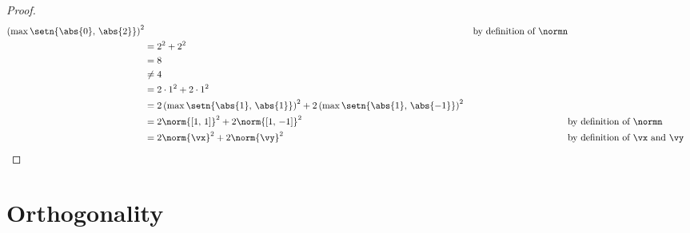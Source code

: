 \begin{proof}
\begin{align*}
       \left(\max\setn{\abs{0},\,\abs{2}}\right)^2
    && \text{by definition of $\normn$}
  \\&= 2^2 + 2^2
  \\&= 8
  \\&\ne  4
  \\&= 2\cdot 1^2 + 2\cdot 1^2
  \\&= 2\left(\max\setn{\abs{1},\,\abs{1}}\right)^2
     + 2\left(\max\setn{\abs{1},\,\abs{-1}}\right)^2
  \\&= 2\norm{[1,\,1]}^2 + 2\norm{[1,\,-1]}^2
    && \text{by definition of $\normn$}
  \\&= 2\norm{\vx}^2 + 2\norm{\vy}^2
    && \text{by definition of $\vx$ and $\vy$}
\end{align*}
\end{proof}

\section{Orthogonality}
\begin{definition}
\label{def:kdelta}
\end{definition}

